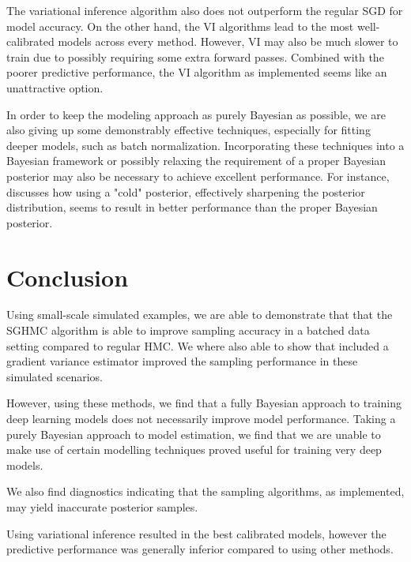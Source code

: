 The variational inference algorithm also does not outperform the regular SGD for model accuracy. 
On the other hand, the VI algorithms lead to the most well-calibrated models across every method. 
However, VI may also be much slower to train due to possibly requiring some extra forward passes.
Combined with the poorer predictive performance, the VI algorithm as implemented seems like an unattractive option.

In order to keep the modeling approach as purely Bayesian as possible, we are also giving up some demonstrably effective techniques, especially for fitting deeper models, such as batch normalization.
Incorporating these techniques into a Bayesian framework or possibly relaxing the requirement of a proper Bayesian posterior may also be necessary to achieve excellent performance.
For instance, \cite{wenzel_how_2020} discusses how using a "cold" posterior, effectively sharpening the posterior distribution, seems to result in better performance than the proper Bayesian posterior.


\chapter{Conclusion}

Using small-scale simulated examples, we are able to demonstrate that that the SGHMC algorithm is able to improve sampling accuracy in a batched data setting compared to regular HMC.
We where also able to show that included a gradient variance estimator improved the sampling performance in these simulated scenarios.

However, using these methods, we find that a fully Bayesian approach to training deep learning models does not necessarily improve model performance.
Taking a purely Bayesian approach to model estimation, we find that we are unable to make use of certain modelling techniques proved useful for training very deep models. 

We also find diagnostics indicating that the sampling algorithms, as implemented, may yield inaccurate posterior samples.

Using variational inference resulted in the best calibrated models, however the predictive performance was generally inferior compared to using other methods.







